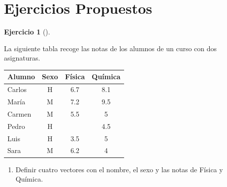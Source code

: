 \documentclass[
  a4paper,
]{scrreport}
\providecommand{\tightlist}{%
  \setlength{\itemsep}{0pt}\setlength{\parskip}{0pt}}\usepackage{longtable,booktabs,array}
\theoremstyle{definition}
\newtheorem{exercise}{Ejercicio}[chapter]
\theoremstyle{remark}
\begin{document}
\hypertarget{ejercicios-propuestos}{%
\section{Ejercicios Propuestos}\label{ejercicios-propuestos}}

\leavevmode{}%
\begin{exercise}[]\label{exr-preprocesaimento-5}

La siguiente tabla recoge las notas de los alumnos de un curso con dos
asignaturas.

\begin{longtable}[]{@{}lccc@{}}
\toprule()
Alumno & Sexo & Física & Química \\
\midrule()
\endhead
Carlos & H & 6.7 & 8.1 \\
María & M & 7.2 & 9.5 \\
Carmen & M & 5.5 & 5 \\
Pedro & H & & 4.5 \\
Luis & H & 3.5 & 5 \\
Sara & M & 6.2 & 4 \\
\bottomrule()
\end{longtable}

\begin{enumerate}
\def\labelenumi{\alph{enumi}.}
\tightlist
\item
  Definir cuatro vectores con el nombre, el sexo y las notas de Física y
  Química.
\end{enumerate}

\begin{tcolorbox}[enhanced jigsaw, title=\textcolor{quarto-callout-tip-color}{\faLightbulb}\hspace{0.5em}{Solución}, coltitle=black, opacitybacktitle=0.6, rightrule=.15mm, colback=white, bottomtitle=1mm, breakable, leftrule=.75mm, opacityback=0, colbacktitle=quarto-callout-tip-color!10!white, left=2mm, colframe=quarto-callout-tip-color-frame, toptitle=1mm, titlerule=0mm, arc=.35mm, bottomrule=.15mm, toprule=.15mm]


\end{tcolorbox}
\end{exercise}
\end{document}
